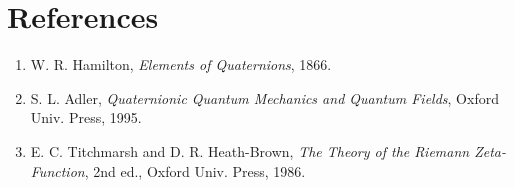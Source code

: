 \documentclass[11pt]{article}
\begin{document}
\section*{References}
\begin{enumerate}
\item W. R. Hamilton, \emph{Elements of Quaternions}, 1866.
\item S. L. Adler, \emph{Quaternionic Quantum Mechanics and Quantum Fields}, Oxford Univ. Press, 1995.
\item E. C. Titchmarsh and D. R. Heath-Brown, \emph{The Theory of the Riemann Zeta-Function}, 2nd ed., Oxford Univ. Press, 1986.
\end{enumerate}
\end{document}
